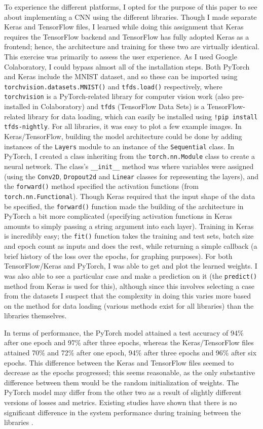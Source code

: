 \documentclass[conference]{IEEEtran}
\begin{document}
To experience the different platforms, I opted for the purpose of this paper to see about implementing a CNN using the different libraries. Though I made separate Keras and TensorFlow files, I learned while doing this assignment that Keras requires the TensorFlow backend and TensorFlow has fully adopted Keras as a frontend; hence, the architecture and training for these two are virtually identical. This exercise was primarily to assess the user experience. As I used Google Colaboratory, I could bypass almost all of the installation steps. Both PyTorch and Keras include the MNIST dataset, and so these can be imported using \verb+torchvision.datasets.MNIST()+ and \verb+tfds.load()+ respectively, where \verb+torchvision+ is a PyTorch-related library for computer vision work (also pre-installed in Colaboratory) and \verb+tfds+ (TensorFlow Data Sets) is a TensorFlow-related library for data loading, which can easily be installed using \verb+!pip install tfds-nightly+. For all libraries, it was easy to plot a few example images. In Keras/TensorFlow, building the model architecture could be done by adding instances of the \verb+Layers+ module to an instance of the \verb+Sequential+ class. In PyTorch, I created a class inheriting from the \verb+torch.nn.Module+ class to create a neural network. The class's \verb+__init__+ method was where variables were assigned (using the \verb+Conv2D+, \verb+Dropout2d+ and \verb+Linear+ classes for representing the layers), and the \verb+forward()+ method specified the activation functions (from \verb+torch.nn.Functional+). Though Keras required that the input shape of the data be specified, the \verb+forward()+ function made the building of the architecture in PyTorch a bit more complicated (specifying activation functions in Keras amounts to simply passing a string argument into each layer). Training in Keras is incredibly easy; the \verb+fit()+ function takes the training and test sets, batch size and epoch count as inputs and does the rest, while returning a simple callback (a brief history of the loss over the epochs, for graphing purposes). For both TensorFlow/Keras and PyTorch, I was able to get and plot the learned weights. I was also able to see a particular case and make a prediction on it (the \verb+predict()+ method from Keras is used for this), although since this involves selecting a case from the datasets I suspect that the complexity in doing this varies more based on the method for data loading (various methods exist for all libraries) than the libraries themselves. 

In terms of performance, the PyTorch model attained a test accuracy of 94\% after one epoch and 97\% after three epochs, whereas the Keras/TensorFlow files attained 70\% and 72\% after one epoch, 94\% after three epochs and 96\% after six epochs. This difference between the Keras and TensorFlow files seemed to decrease as the epochs progressed; this seems reasonable, as the only substantive difference between them would be the random initialization of weights. The PyTorch model may differ from the other two as a result of slightly different versions of losses and metrics. Existing studies have shown that there is no significant difference in the system performance during training between the libraries \cite{Dai}\cite{Chirodea}.  
\end{document}
